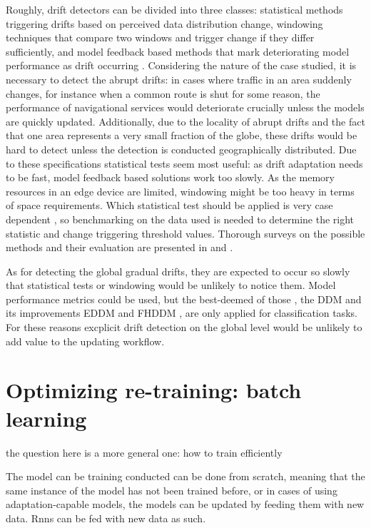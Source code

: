 Roughly, drift detectors can be divided into three classes: statistical methods triggering drifts based on perceived data distribution change, windowing techniques that compare two windows and trigger change if they differ sufficiently, and model feedback based methods that mark deteriorating model performance as drift occurring \cite{faithfull_unsupervised_2018}. Considering the nature of the case studied, it is necessary to detect the abrupt drifts: in cases where traffic in an area suddenly changes, for instance when a common route is shut for some reason, the performance of navigational services would deteriorate crucially unless the models are quickly updated. Additionally, due to the locality of abrupt drifts and the fact that one area represents a very small fraction of the globe, these drifts would be hard to detect unless the detection is conducted geographically distributed. Due to these specifications statistical tests seem most useful: as drift adaptation needs to be fast, model feedback based solutions work too slowly. As the memory resources in an edge device are limited, windowing might be too heavy in terms of space requirements. Which statistical test should be applied is very case dependent \cite{faithfull_unsupervised_2018}, so benchmarking on the data used is needed to determine the right statistic and change triggering threshold values. Thorough surveys on the possible methods and their evaluation are presented in \cite{conceptdriftsurvey} and \cite{faithfull_unsupervised_2018}.

As for detecting the global gradual drifts, they are expected to occur so slowly that statistical tests or windowing would be unlikely to notice them. Model performance metrics could be used, but the best-deemed of those \cite{celik_adaptation_2021} \cite{madrid_towards_2019}, the DDM \cite{gama_learning_2004} and its improvements EDDM \cite{baena-garcia_early_2006} and FHDDM \cite{frasconi_fast_2016}, are only applied for classification tasks. For these reasons excplicit drift detection on the global level would be unlikely to add value to the updating workflow. 

\section{Optimizing re-training: batch learning}

the question here is a more general one: how to train efficiently

 The model can be training conducted can be done from scratch, meaning that the same instance of the model has not been trained before, or in cases of using adaptation-capable models, the models can be updated by feeding them with new data. Rnns can be fed with new data as such.

